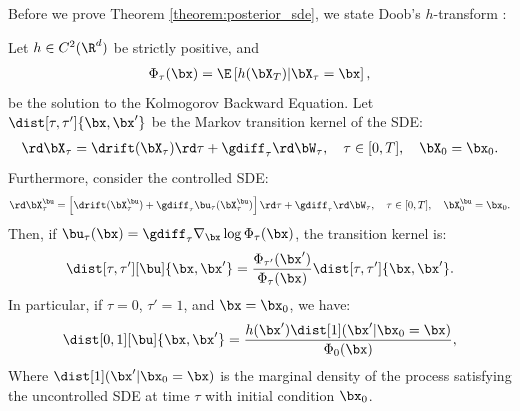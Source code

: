 Before we prove Theorem \ref{theorem:posterior_sde}, we state Doob's $h$-transform \cite{zhang_sampling_nodate, sarkka_applied_2019}:
\begin{proposition}
Let $h\in C^2(\R^d)$ be strictly positive, and
\begin{align}
    \Phi_\tau(\bx) = \E\left[ h(\bX_T) | \bX_\tau = \bx \right],
\end{align}
be the solution to the Kolmogorov Backward Equation. Let $\dist[\tau, \tau']{\bx, \bx'}$ be the Markov transition kernel of the SDE:
\begin{align}\label{eq:uncontrolled_SDE}
\begin{split}
    \rd \bX_{\tau} = \drift(\bX_{\tau}) \rd \tau + \gdiff_\tau \rd \bW_\tau, \quad  \tau \in [0,T], \quad \bX_0 = \bx_0.
\end{split}
\end{align}
Furthermore, consider the controlled SDE:
\begin{align}\label{eq:controlled_SDE}
\begin{split}
    \rd \bX_{\tau}^{\bu} = \left[\drift(\bX_{\tau}^{\bu}) + \gdiff_\tau\bu_{\tau}(\bX_{\tau}^{\bu})\right] \rd \tau + \gdiff_\tau \rd \bW_\tau, \quad   \tau \in [0,T], \quad \bX_0^{\bu} = \bx_0.
\end{split}
\end{align}
Then, if $\bu_{\tau}(\bx) = \gdiff_\tau \nabla_{\bx}\log\Phi_\tau(\bx)$, the transition kernel is:
\begin{align}
    \dist[\tau, \tau'][\bu]{\bx, \bx'} = \frac{\Phi_{\tau'}(\bx')}{\Phi_\tau(\bx)} \dist[\tau, \tau']{\bx, \bx'}.
\end{align}
In particular, if $\tau=0$, $\tau'=1$, and $\bx=\bx_0$, we have:
\begin{align}
    \dist[0, 1][\bu]{\bx, \bx'} = \frac{h(\bx')\dist[1](\bx' | \bx_0=\bx)}{\Phi_0(\bx)},
\end{align}
Where $\dist[1](\bx' | \bx_0=\bx)$ is the marginal density of the process satisfying the uncontrolled SDE at time $\tau$ with initial condition $\bx_0$.
\end{proposition}

